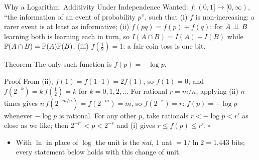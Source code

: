 \begin{frame}{Why a Logarithm: Additivity Under Independence}
  \small
  Wanted: $f\colon(0,1]\to[0,\infty)$, ``the information of an event of probability $p$'', such that
  (i) $f$ is non-increasing: a rarer event is at least as informative;
  (ii) $f(pq)=f(p)+f(q)$: for $A\perp\!\!\!\perp B$ learning both is learning each in turn, so $I(A\cap B)=I(A)+I(B)$ while $\mathbb{P}(A\cap B)=\mathbb{P}(A)\mathbb{P}(B)$;
  (iii) $f(\tfrac12)=1$: a fair coin toss is one bit.
  \begin{block}{Theorem}
    The only such function is $f(p)=-\log p$.
  \end{block}
  \begin{block}{Proof}
    From (ii), $f(1)=f(1\cdot1)=2f(1)$, so $f(1)=0$; and $f(2^{-k})=k\,f(\tfrac12)=k$ for $k=0,1,2,\dots$
    For rational $r=m/n$, applying (ii) $n$ times gives $n\,f(2^{-m/n})=f(2^{-m})=m$, so $f(2^{-r})=r$: $f(p)=-\log p$ whenever $-\log p$ is rational.
    For any other $p$, take rationals $r<-\log p<r'$ as close as we like; then $2^{-r'}<p<2^{-r}$ and (i) gives $r\le f(p)\le r'$. \hfill$\square$
  \end{block}
  \begin{itemize}
    \item With $\ln$ in place of $\log$ the unit is the \emph{nat}, $1$ nat $=1/\ln2=1.443$ bits; every statement below holds with this change of unit.
  \end{itemize}
\end{frame}

